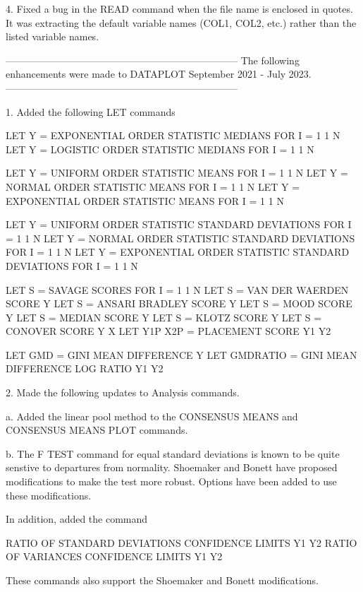  4. Fixed a bug in the READ command when the file name is enclosed in
    quotes.  It was extracting the default variable names (COL1, COL2,
    etc.) rather than the listed variable names.

-----------------------------------------------------------------------
The following enhancements were made to DATAPLOT
September 2021 - July 2023.
-----------------------------------------------------------------------

 1. Added the following LET commands

        LET Y = EXPONENTIAL ORDER STATISTIC MEDIANS FOR I = 1 1 N
        LET Y = LOGISTIC    ORDER STATISTIC MEDIANS FOR I = 1 1 N

        LET Y = UNIFORM     ORDER STATISTIC MEANS   FOR I = 1 1 N
        LET Y = NORMAL      ORDER STATISTIC MEANS   FOR I = 1 1 N
        LET Y = EXPONENTIAL ORDER STATISTIC MEANS   FOR I = 1 1 N

        LET Y = UNIFORM     ORDER STATISTIC STANDARD DEVIATIONS FOR I = 1 1 N
        LET Y = NORMAL      ORDER STATISTIC STANDARD DEVIATIONS FOR I = 1 1 N
        LET Y = EXPONENTIAL ORDER STATISTIC STANDARD DEVIATIONS FOR I = 1 1 N

        LET S = SAVAGE SCORES FOR I = 1 1 N
        LET S = VAN DER WAERDEN SCORE Y
        LET S = ANSARI BRADLEY SCORE Y
        LET S = MOOD SCORE Y
        LET S = MEDIAN SCORE Y
        LET S = KLOTZ SCORE Y
        LET S = CONOVER SCORE Y X
        LET Y1P X2P = PLACEMENT SCORE Y1 Y2

        LET GMD      = GINI MEAN DIFFERENCE Y
        LET GMDRATIO = GINI MEAN DIFFERENCE LOG RATIO Y1 Y2

 2. Made the following updates to Analysis commands.

    a. Added the linear pool method to the CONSENSUS MEANS and CONSENSUS
       MEANS PLOT commands.

    b. The F TEST command for equal standard deviations is known to be
       quite senstive to departures from normality.  Shoemaker and Bonett
       have proposed modifications to make the test more robust.  Options
       have been added to use these modifications.

       In addition, added the command

          RATIO OF STANDARD DEVIATIONS CONFIDENCE LIMITS Y1 Y2
          RATIO OF VARIANCES           CONFIDENCE LIMITS Y1 Y2

       These commands also support the Shoemaker and Bonett modifications.

